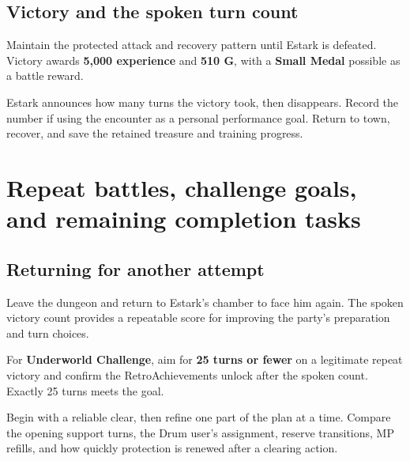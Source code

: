 \subsection*{Victory and the spoken turn count}

Maintain the protected attack and recovery pattern
until Estark is defeated. Victory awards
\textbf{5,000 experience} and \textbf{510 G}, with
a \textbf{Small Medal} possible as a battle reward.

Estark announces how many turns the victory took,
then disappears. Record the number if using the
encounter as a personal performance goal. Return
to town, recover, and save the retained treasure
and training progress.



\section{Repeat battles, challenge goals, and remaining completion tasks}

\subsection*{Returning for another attempt}

Leave the dungeon and return to Estark's chamber
to face him again. The spoken victory count provides
a repeatable score for improving the party's preparation
and turn choices.

For \textbf{Underworld Challenge}, aim for \textbf{25 turns or fewer}
on a legitimate repeat victory and confirm the RetroAchievements
unlock after the spoken count. Exactly 25 turns meets the goal.

Begin with a reliable clear, then refine one part
of the plan at a time. Compare the opening support
turns, the Drum user's assignment, reserve transitions,
MP refills, and how quickly protection is renewed
after a clearing action.

